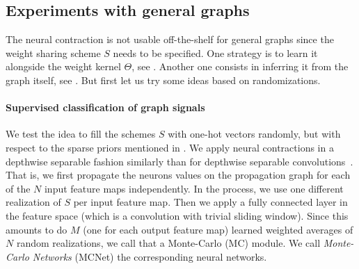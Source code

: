 



\subsection{Experiments with general graphs}
\label{sec:gsexp}

The neural contraction is not usable off-the-shelf for general graphs since the weight sharing scheme $S$ needs to be specified. One strategy is to learn it alongside the weight kernel $\Theta$, see . Another one consists in inferring it from the graph itself, see . But first let us try some ideas based on randomizations.

\paragraph{Supervised classification of graph signals}

We test the idea to fill the schemes $S$ with one-hot vectors randomly, but with respect to the sparse priors mentioned in . We apply neural contractions in a depthwise separable fashion similarly than for depthwise separable convolutions~\citep{chollet2016xception}. That is, we first propagate the neurons values on the propagation graph for each of the $N$ input feature maps independently. In the process, we use one different realization of $S$ per input feature map. Then we apply a fully connected layer in the feature space (which is a convolution with trivial sliding window). Since this amounts to do $M$ (one for each output feature map) learned weighted averages of $N$ random realizations, we call that a Monte-Carlo (MC) module. We call \emph{Monte-Carlo Networks} (MCNet) the corresponding neural networks.

